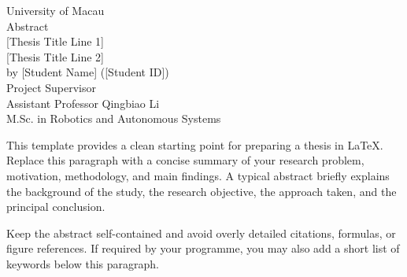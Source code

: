 

\begin{center}
	{University of Macau} \\[0.1cm]
	
	Abstract\\[0.1cm]
	
	{[Thesis Title Line 1]} \\[-0.3cm]
	{[Thesis Title Line 2]} \\[0.5cm]

	by [Student Name] ([Student ID]) \\[0.1cm]
	
	Project Supervisor \\[-0.3cm]
	{Assistant Professor Qingbiao Li} \\[0.1cm]
	
	{M.Sc. in Robotics and Autonomous Systems}
\end{center}

\vspace{1.0cm}

\noindent This template provides a clean starting point for preparing a thesis in LaTeX. Replace this paragraph with a concise summary of your research problem, motivation, methodology, and main findings. A typical abstract briefly explains the background of the study, the research objective, the approach taken, and the principal conclusion.

\noindent Keep the abstract self-contained and avoid overly detailed citations, formulas, or figure references. If required by your programme, you may also add a short list of keywords below this paragraph.

\restoregeometry
